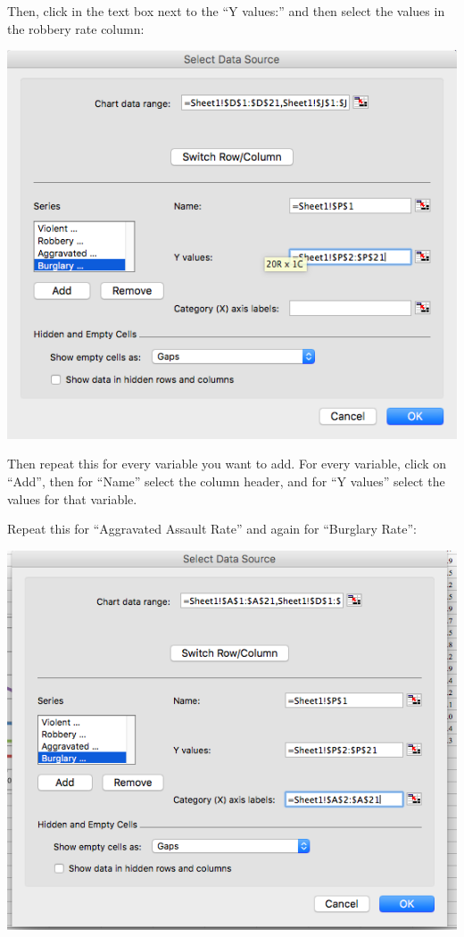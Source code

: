 \documentclass[
]{book}
\begin{document}
Then, click in the text box next to the ``Y values:'' and then select the values in the robbery rate column:

\includegraphics{imgs/comp_c_4.png}

Then repeat this for every variable you want to add. For every variable, click on ``Add'', then for ``Name'' select the column header, and for ``Y values'' select the values for that variable.

Repeat this for ``Aggravated Assault Rate'' and again for ``Burglary Rate'':

\includegraphics{imgs/comp_c_5.png}
\end{document}
